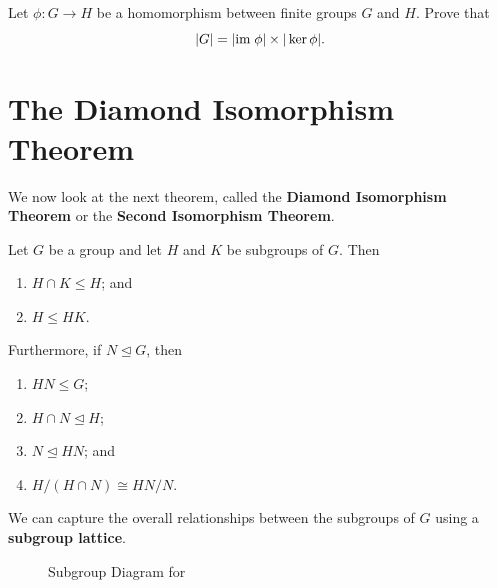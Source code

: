 \begin{exercise}
    Let $\phi: G \to H$ be a homomorphism between finite groups $G$ and $H$. Prove that
    \[
        |G| = |\mathrm{im}\; \phi|\times|\ker \phi|.
    \]
\end{exercise}

\section{The Diamond Isomorphism Theorem}
We now look at the next theorem, called the \textbf{Diamond Isomorphism Theorem} or the \textbf{Second Isomorphism Theorem}.
\begin{theorem}\label{thrm-isomorphism-2}
    Let $G$ be a group and let $H$ and $K$ be subgroups of $G$. Then
    \begin{enumerate}
        \item $H \cap K \leq H$; and
        \item $H \leq HK$.
    \end{enumerate}
    Furthermore, if $N \unlhd G$, then
    \begin{enumerate}[start=3]
        \item $HN \leq G$;
        \item $H \cap N \unlhd H$;
        \item $N \unlhd HN$; and
        \item $H / (H\cap N) \cong HN / N$.
    \end{enumerate}
\end{theorem}
We can capture the overall relationships between the subgroups of $G$ using a \textbf{subgroup lattice}.
\begin{figure}[h]
    \centering
    \caption{Subgroup Diagram for }
\end{figure}

